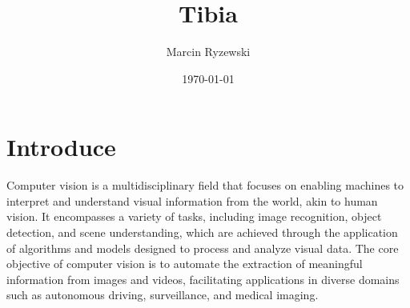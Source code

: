 \documentclass{article}
\begin{document}
\title{Tibia}
\author{Marcin Ryzewski}
\date{\today}
\maketitle  

\section{Introduce}

Computer vision is a multidisciplinary field that focuses 
on enabling machines to interpret and understand visual 
information from the world, akin to human vision. 
It encompasses a variety of tasks, including image 
recognition, object detection, and scene understanding, 
which are achieved through the application of algorithms and 
models designed to process and analyze visual data. 
The core objective of computer vision is to automate the 
extraction of meaningful information from images and videos, 
facilitating applications in diverse domains such as 
autonomous driving, surveillance, and medical imaging.
\end{document}
